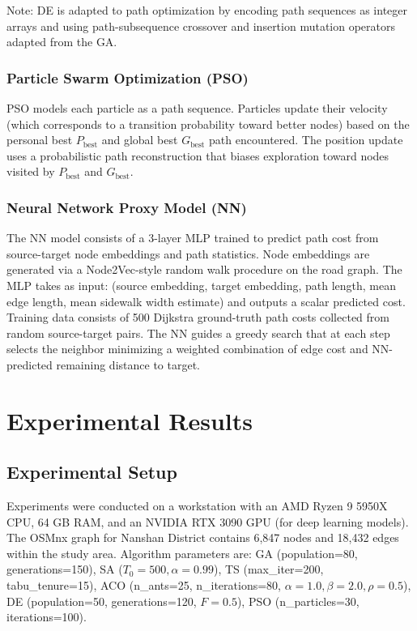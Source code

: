 \documentclass[journal]{IEEEtran}
\begin{document}
Note: DE is adapted to path optimization by encoding path sequences as integer arrays and using path-subsequence crossover and insertion mutation operators adapted from the GA.

\subsubsection{Particle Swarm Optimization (PSO)}
PSO models each particle as a path sequence. Particles update their velocity (which corresponds to a transition probability toward better nodes) based on the personal best $P_{\text{best}}$ and global best $G_{\text{best}}$ path encountered. The position update uses a probabilistic path reconstruction that biases exploration toward nodes visited by $P_{\text{best}}$ and $G_{\text{best}}$.

\subsubsection{Neural Network Proxy Model (NN)}
The NN model consists of a 3-layer MLP trained to predict path cost from source-target node embeddings and path statistics. Node embeddings are generated via a Node2Vec-style random walk procedure \cite{grover2016node2vec} on the road graph. The MLP takes as input: (source embedding, target embedding, path length, mean edge length, mean sidewalk width estimate) and outputs a scalar predicted cost. Training data consists of 500 Dijkstra ground-truth path costs collected from random source-target pairs. The NN guides a greedy search that at each step selects the neighbor minimizing a weighted combination of edge cost and NN-predicted remaining distance to target.

\section{Experimental Results}
\label{sec:results}

\subsection{Experimental Setup}

Experiments were conducted on a workstation with an AMD Ryzen 9 5950X CPU, 64 GB RAM, and an NVIDIA RTX 3090 GPU (for deep learning models). The OSMnx graph for Nanshan District contains 6,847 nodes and 18,432 edges within the study area. Algorithm parameters are: GA (population=80, generations=150), SA ($T_0=500, \alpha=0.99$), TS (max\_iter=200, tabu\_tenure=15), ACO (n\_ants=25, n\_iterations=80, $\alpha=1.0, \beta=2.0, \rho=0.5$), DE (population=50, generations=120, $F=0.5$), PSO (n\_particles=30, iterations=100).
\end{document}
